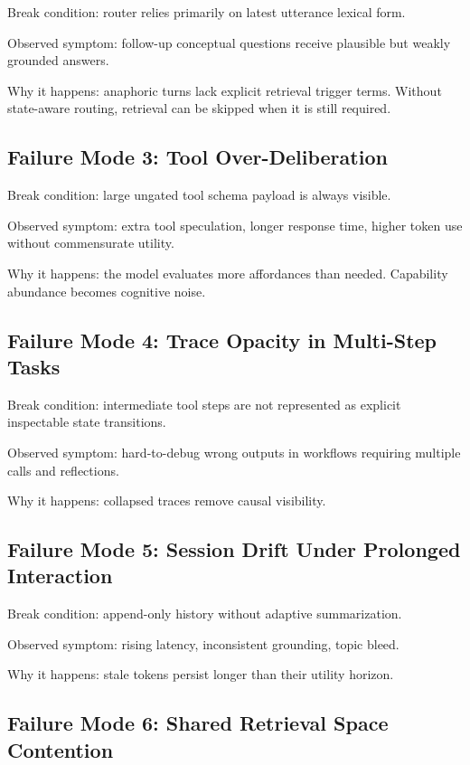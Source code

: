 \documentclass[conference]{IEEEtran}
\begin{document}
Break condition:
router relies primarily on latest utterance lexical form.

Observed symptom:
follow-up conceptual questions receive plausible but weakly grounded answers.

Why it happens:
anaphoric turns lack explicit retrieval trigger terms.
Without state-aware routing,
retrieval can be skipped when it is still required.

\subsection{Failure Mode 3: Tool Over-Deliberation}

Break condition:
large ungated tool schema payload is always visible.

Observed symptom:
extra tool speculation,
longer response time,
higher token use without commensurate utility.

Why it happens:
the model evaluates more affordances than needed.
Capability abundance becomes cognitive noise.

\subsection{Failure Mode 4: Trace Opacity in Multi-Step Tasks}

Break condition:
intermediate tool steps are not represented as explicit inspectable state transitions.

Observed symptom:
hard-to-debug wrong outputs in workflows requiring multiple calls and reflections.

Why it happens:
collapsed traces remove causal visibility.

\subsection{Failure Mode 5: Session Drift Under Prolonged Interaction}

Break condition:
append-only history without adaptive summarization.

Observed symptom:
rising latency,
inconsistent grounding,
topic bleed.

Why it happens:
stale tokens persist longer than their utility horizon.

\subsection{Failure Mode 6: Shared Retrieval Space Contention}
\end{document}
